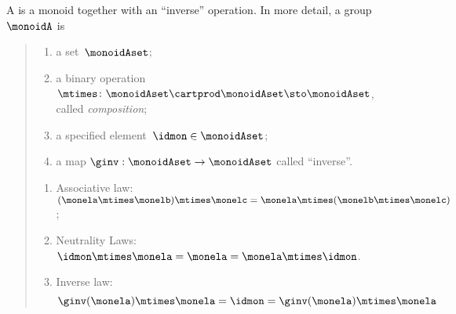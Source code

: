 

\section{}\label{sec:groups}


\begin{ctdefinition}[Group]
  \label{def:group}
  A \emph{} is a monoid together with an ``inverse'' operation.
  In more detail, a group $\monoidA$ is
  \begin{quote}
    \constit
    \begin{enumerate}
      \item a set~$\monoidAset$;
      \item a binary operation~$\mtimes \colon \monoidAset \cartprod \monoidAset \sto \monoidAset$, called \emph{composition};
      \item a specified element~$\idmon\in \monoidAset$;
      \item a map $\ginv: \monoidAset \to \monoidAset$ called ``inverse''.
    \end{enumerate}
    \condit
    \begin{enumerate}
      \item Associative law:~$(\monela\mtimes \monelb)\mtimes \monelc=\monela\mtimes (\monelb\mtimes \monelc)$;
      \item Neutrality Laws:~$\idmon\mtimes \monela=\monela=\monela \mtimes \idmon$.
      \item Inverse law:
      \begin{equation}\label{eq:group-inverse-law}
        \ginv(\monela) \mtimes \monela = \idmon = \ginv(\monela) \mtimes \monela
      \end{equation}
    \end{enumerate}
  \end{quote}
\end{ctdefinition}

